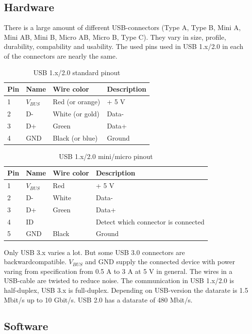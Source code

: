 \documentclass{acm_proc_article-sp}
\begin{document}
\subsection{Hardware}
There is a large amount of different USB-connectors (Type A, Type B, Mini A, Mini AB, Mini B, Micro AB, Micro B, Type C). They vary in size, profile, durability, compability and usability.
The used pins used in USB 1.x/2.0 in each of the connectors are nearly the same.

\begin{table}
\centering
\caption{USB 1.x/2.0 standard pinout}
\begin{tabular}{|l|l|l|l|} \hline
Pin & Name & Wire color & Description\\ \hline
1 & $V_{BUS}$ & Red (or orange) & + 5 V\\ \hline
2 & D- & White (or gold) & Data-\\ \hline
3 & D+ & Green & Data+\\ \hline
4 & GND & Black (or blue) & Ground\\ \hline
\end{tabular}
\end{table}

\begin{table}
\centering
\caption{USB 1.x/2.0 mini/micro pinout}
\begin{tabular}{|l|l|l|l|} \hline
Pin & Name & Wire color & Description\\ \hline
1 & $V_{BUS}$ & Red & + 5 V\\ \hline
2 & D- & White & Data-\\ \hline
3 & D+ & Green & Data+\\ \hline
4 & ID &  & Detect which connector is connected\\ \hline
5 & GND & Black & Ground\\ \hline
\end{tabular}
\end{table}

Only USB 3.x varies a lot. But some USB 3.0 connectors are backwardcompatible.
$V_{BUS}$ and GND supply the connected device with power varing from specification from 0.5 A to 3 A at 5 V in general. The wires in a USB-cable are twisted to reduce noise. The communication in USB 1.x/2.0 is half-duplex, USB 3.x is full-duplex.
Depending on USB-version the datarate is 1.5 Mbit/s up to 10 Gbit/s. USB 2.0 has a datarate of 480 Mbit/s.

\subsection{Software} %
\end{document}
